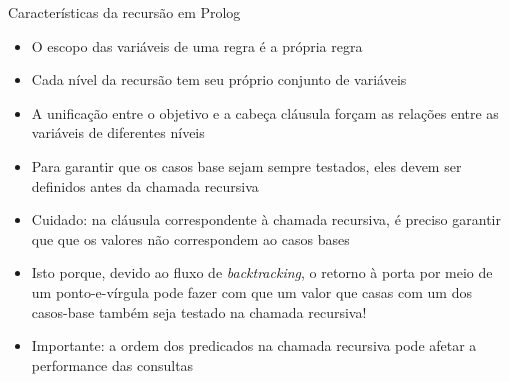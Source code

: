\begin{frame}[fragile]{Características da recursão em Prolog}

    \begin{itemize}
        \item O escopo das variáveis de uma regra é a própria regra

        \item Cada nível da recursão tem seu próprio conjunto de variáveis

        \item A unificação entre o objetivo e a cabeça cláusula forçam as relações entre as 
            variáveis de diferentes níveis

        \item Para garantir que os casos base sejam sempre testados, eles devem ser definidos 
            antes da chamada recursiva

        \item Cuidado: na cláusula correspondente à chamada recursiva, é preciso garantir que
            que os valores não correspondem ao casos bases

        \item Isto porque, devido ao fluxo de \textit{backtracking}, o retorno à porta
             por meio de um ponto-e-vírgula pode fazer com que um valor
            que casas com um dos casos-base também seja testado na chamada recursiva!
            
        \item Importante: a ordem dos predicados na chamada recursiva pode afetar a 
            performance das consultas

    \end{itemize}

\end{frame}
